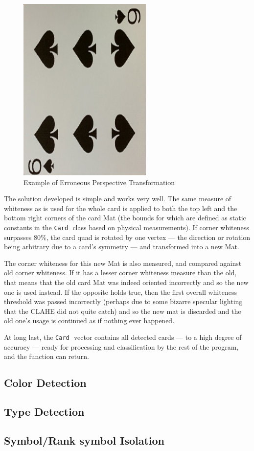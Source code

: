 \documentclass[a4paper,12pt,notitlepage]{article}
\newcommand{\code}[1]{\colorbox{white}{\lstinline[basicstyle=\ttfamily\color{black}]|#1|} }
\begin{document}
\begin{figure}[ht]
				\includegraphics[width=0.3\linewidth]{rot4}
				\caption{Example of Erroneous Perspective Transformation}
				\label{fig:rot}
			\end{figure}

			The solution developed is simple and works very well. The same measure of whiteness as is used for the whole card is applied to both the top left and the bottom right corners of the card Mat (the bounds for which are defined as static constants in the \code{Card} class based on physical measurements). If corner whiteness surpasses 80\%, the card quad is rotated by one vertex --- the direction or rotation being arbitrary due to a card's symmetry --- and transformed into a new Mat.

			The corner whiteness for this new Mat is also measured, and compared against old corner whiteness. If it has a lesser corner whiteness measure than the old, that means that the old card Mat was indeed oriented incorrectly and so the new one is used instead. If the opposite holds true, then the first overall whiteness threshold was passed incorrectly (perhaps due to some bizarre specular lighting that the CLAHE did not quite catch) and so the new mat is discarded and the old one's usage is continued as if nothing ever happened.

			At long last, the \code{Card} vector contains all detected cards --- to a high degree of accuracy --- ready for processing and classification by the rest of the program, and the function can return.

	\subsection{Color Detection}
	\subsection{Type Detection}
	\subsection{Symbol/Rank symbol Isolation}
\end{document}
